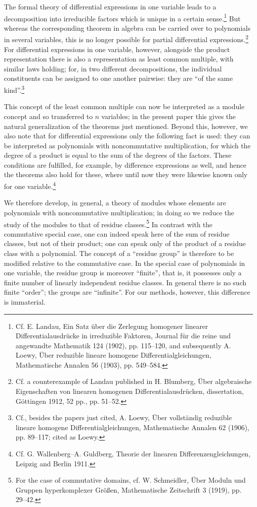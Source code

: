 \documentclass[11pt]{article}
\begin{document}
The formal theory of differential expressions in one variable leads to a decomposition into irreducible factors which is unique in a certain sense.\footnote{Cf. E. Landau, Ein Satz über die Zerlegung homogener linearer Differentialausdrücke in irreduzible Faktoren, Journal für die reine und angewandte Mathematik 124 (1902), pp. 115--120, and subsequently A. Loewy, Über reduzible lineare homogene Differentialgleichungen, Mathematische Annalen 56 (1903), pp. 549--584.} But whereas the corresponding theorem in algebra can be carried over to polynomials in several variables, this is no longer possible for partial differential expressions.\footnote{Cf. a counterexample of Landau published in H. Blumberg, Über algebraische Eigenschaften von linearen homogenen Differentialausdrücken, dissertation, Göttingen 1912, 52 pp., pp. 51--52.} For differential expressions in one variable, however, alongside the product representation there is also a representation as least common multiple, with similar laws holding; for, in two different decompositions, the individual constituents can be assigned to one another pairwise: they are ``of the same kind''.\footnote{Cf., besides the papers just cited, A. Loewy, Über vollständig reduzible lineare homogene Differentialgleichungen, Mathematische Annalen 62 (1906), pp. 89--117; cited as Loewy.}

This concept of the least common multiple can now be interpreted as a module concept and so transferred to $n$ variables; in the present paper this gives the natural generalization of the theorems just mentioned. Beyond this, however, we also note that for differential expressions only the following fact is used: they can be interpreted as polynomials with noncommutative multiplication, for which the degree of a product is equal to the sum of the degrees of the factors. These conditions are fulfilled, for example, by difference expressions as well, and hence the theorems also hold for these, where until now they were likewise known only for one variable.\footnote{Cf. G. Wallenberg--A. Guldberg, Theorie der linearen Differenzengleichungen, Leipzig and Berlin 1911.}

We therefore develop, in general, a theory of modules whose elements are polynomials with noncommutative multiplication; in doing so we reduce the study of the modules to that of residue classes.\footnote{For the case of commutative domains, cf. W. Schmeidler, Über Moduln und Gruppen hyperkomplexer Größen, Mathematische Zeitschrift 3 (1919), pp. 29--42.} In contrast with the commutative special case, one can indeed speak here of the sum of residue classes, but not of their product; one can speak only of the product of a residue class with a polynomial. The concept of a ``residue group'' is therefore to be modified relative to the commutative case. In the special case of polynomials in one variable, the residue group is moreover ``finite'', that is, it possesses only a finite number of linearly independent residue classes. In general there is no such finite ``order''; the groups are ``infinite''. For our methods, however, this difference is immaterial.
\end{document}
